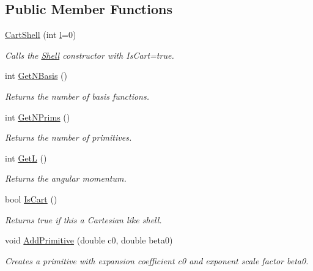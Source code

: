 \subsection*{Public Member Functions}
\begin{DoxyCompactItemize}
\item 
\hyperlink{classJKBuilder_1_1CartShell_a57fcc9d47cb98edd56f6e2122f15afd6}{CartShell} (int \hyperlink{classJKBuilder_1_1Shell_a89606eca6b563ec68d2da2e84657736f}{l}=0)
\begin{DoxyCompactList}\small\item\em Calls the \hyperlink{classJKBuilder_1_1Shell}{Shell} constructor with IsCart=true. \item\end{DoxyCompactList}\item 
int \hyperlink{classJKBuilder_1_1CartShell_a297c144fb990284ac5973c99cdd55f91}{GetNBasis} ()
\begin{DoxyCompactList}\small\item\em Returns the number of basis functions. \item\end{DoxyCompactList}\item 
int \hyperlink{classJKBuilder_1_1Shell_abc886cd4e35d3c56a0250b7d06986f61}{GetNPrims} ()
\begin{DoxyCompactList}\small\item\em Returns the number of primitives. \item\end{DoxyCompactList}\item 
int \hyperlink{classJKBuilder_1_1Shell_a7cc8fc5bc043267a7b47e69503e0e308}{GetL} ()
\begin{DoxyCompactList}\small\item\em Returns the angular momentum. \item\end{DoxyCompactList}\item 
bool \hyperlink{classJKBuilder_1_1Shell_a75c22d97e837f5c439eb51aa223bed98}{IsCart} ()
\begin{DoxyCompactList}\small\item\em Returns true if this a Cartesian like shell. \item\end{DoxyCompactList}\item 
void \hyperlink{classJKBuilder_1_1Shell_a20ec923cb07d5d3762fffa4501d09924}{AddPrimitive} (double c0, double beta0)
\begin{DoxyCompactList}\small\item\em Creates a primitive with expansion coefficient c0 and exponent scale factor beta0. \item\end{DoxyCompactList}\item 

\end{DoxyCompactItemize}
